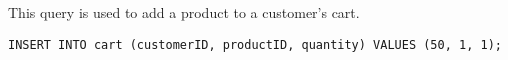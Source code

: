 This query is used to add a product to a customer's cart.

\begin{lstlisting}
INSERT INTO cart (customerID, productID, quantity) VALUES (50, 1, 1);
\end{lstlisting}